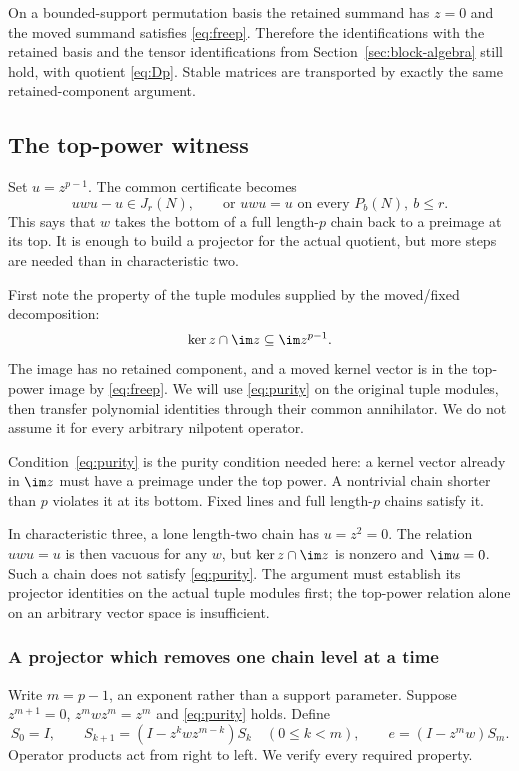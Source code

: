On a bounded-support permutation basis the retained summand has $z=0$ and the moved summand satisfies \eqref{eq:freep}. Therefore the identifications with the retained basis and the tensor identifications from Section~\ref{sec:block-algebra} still hold, with quotient \eqref{eq:Dp}. Stable matrices are transported by exactly the same retained-component argument.

\subsection{The top-power witness}\label{sec:topwitness}
Set $u=z^{p-1}$. The common certificate becomes
\begin{equation}\label{eq:topwitness}uwu-u\in J_r(N),\qquad\text{or }uwu=u\text{ on every }P_b(N),\ b\le r.
\end{equation}
This says that $w$ takes the bottom of a full length-$p$ chain back to a preimage at its top. It is enough to build a projector for the actual quotient, but more steps are needed than in characteristic two.

First note the property of the tuple modules supplied by the moved/fixed decomposition:
\begin{equation}\label{eq:purity}\ker z\cap\im z\subseteq\im z^{p-1}.
\end{equation}
The image has no retained component, and a moved kernel vector is in the top-power image by \eqref{eq:freep}. We will use \eqref{eq:purity} on the original tuple modules, then transfer polynomial identities through their common annihilator. We do not assume it for every arbitrary nilpotent operator.

Condition~\eqref{eq:purity} is the purity condition needed here: a
kernel vector already in $\im z$ must have a preimage under the top
power. A nontrivial chain shorter than $p$ violates it at its bottom.
Fixed lines and full length-$p$ chains satisfy it.

\begin{example}
In characteristic three, a lone length-two chain has $u=z^2=0$. The relation $uwu=u$ is then vacuous for any $w$, but $\ker z\cap\im z$ is nonzero and $\im u=0$. Such a chain does not satisfy \eqref{eq:purity}. The argument must establish its projector identities on the actual tuple modules first; the top-power relation alone on an arbitrary vector space is insufficient.
\end{example}

\subsubsection{A projector which removes one chain level at a time}
Write $m=p-1$, an exponent rather than a support parameter. Suppose $z^{m+1}=0$, $z^mwz^m=z^m$ and \eqref{eq:purity} holds. Define
\begin{equation}\label{eq:projectorp}
S_0=I,\qquad S_{k+1}=(I-z^kwz^{m-k})S_k\quad(0\le k<m),
\qquad e=(I-z^mw)S_m.
\end{equation}
Operator products act from right to left. We verify every required property.

